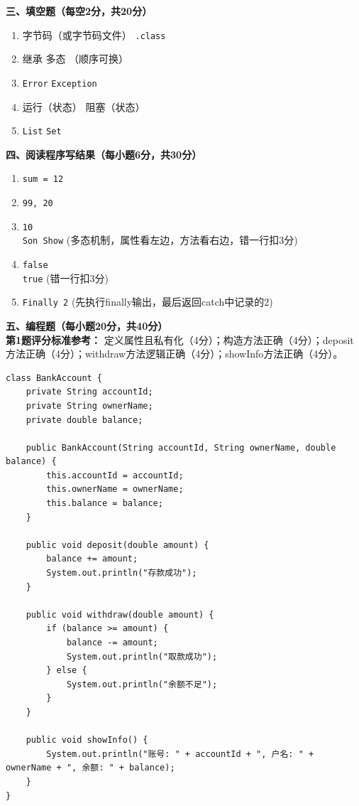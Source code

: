 \documentclass[a3paper, landscape, 11pt, twocolumn]{article}
\begin{document}
\vspace{1em}
\textbf{三、填空题（每空2分，共20分）}
\begin{enumerate}[label=\arabic*., itemsep=0.5em]
	\item 字节码（或字节码文件） \quad \texttt{.class}
	\item 继承 \quad 多态 （顺序可换）
	\item \texttt{Error} \quad \texttt{Exception}
	\item 运行（状态） \quad 阻塞（状态）
	\item \texttt{List} \quad \texttt{Set}
\end{enumerate}

\vspace{1em}
\textbf{四、阅读程序写结果（每小题6分，共30分）}
\begin{enumerate}[label=\arabic*., itemsep=0.5em]
	\item \texttt{sum = 12}
	\item \texttt{99, 20}
	\item \texttt{10}\\ \texttt{Son Show} \quad (多态机制，属性看左边，方法看右边，错一行扣3分)
	\item \texttt{false}\\ \texttt{true} \quad (错一行扣3分)
	\item \texttt{Finally 2} \quad (先执行finally输出，最后返回catch中记录的2)
\end{enumerate}

\vspace{1em}
\textbf{五、编程题（每小题20分，共40分）}
\\
\textbf{第1题评分标准参考：}
定义属性且私有化（4分）；构造方法正确（4分）；deposit方法正确（4分）；withdraw方法逻辑正确（4分）；showInfo方法正确（4分）。
\begin{lstlisting}[style=JavaExam]
class BankAccount {
    private String accountId;
    private String ownerName;
    private double balance;

    public BankAccount(String accountId, String ownerName, double balance) {
        this.accountId = accountId;
        this.ownerName = ownerName;
        this.balance = balance;
    }

    public void deposit(double amount) {
        balance += amount;
        System.out.println("存款成功");
    }

    public void withdraw(double amount) {
        if (balance >= amount) {
            balance -= amount;
            System.out.println("取款成功");
        } else {
            System.out.println("余额不足");
        }
    }

    public void showInfo() {
        System.out.println("账号: " + accountId + ", 户名: " + ownerName + ", 余额: " + balance);
    }
}
\end{lstlisting}
\end{document}
